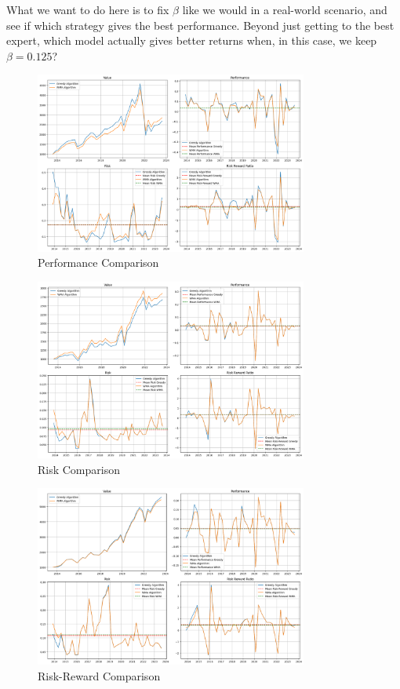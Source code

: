 \documentclass{article}
\begin{document}
What we want to do here is to fix $\beta$ like we would in a real-world scenario, and see if which strategy gives the best performance. Beyond just getting to the best expert, which model actually gives better returns when, in this case, we keep $\beta=0.125$?
\begin{figure}[H]
    \centering
    \includegraphics[width=0.8\textwidth]{performance_comparison.png}
    \caption{Performance Comparison}
    \label{fig:performance_comparison}
\end{figure}
\begin{figure}[H]
    \centering
    \includegraphics[width=0.8\textwidth]{risk_comparison.png}
    \caption{Risk Comparison}
    \label{fig:risk_comparison}
\end{figure}
\begin{figure}[H]
    \centering
    \includegraphics[width=0.8\textwidth]{risk_reward_comparison.png}
    \caption{Risk-Reward Comparison}
    \label{fig:risk_reward_comparison}
\end{figure}
\end{document}
